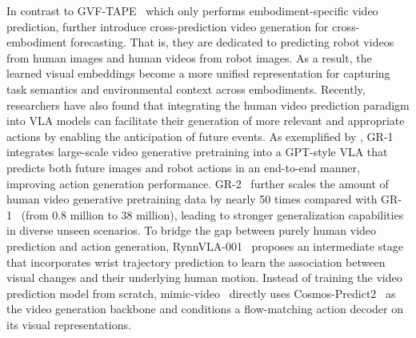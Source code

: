 \documentclass[Afour,sageh,times]{sagej}
\begin{document}
In contrast to GVF-TAPE~\citep{zhang2025generative} which only performs embodiment-specific video prediction, \cite{zhu2025learning} further introduce cross-prediction video generation for cross-embodiment forecasting. That is, they are dedicated to predicting robot videos from human images and human videos from robot images. As a result, the learned visual embeddings become a more unified representation for capturing task semantics and environmental context across embodiments. Recently, researchers have also found that integrating the human video prediction paradigm into VLA models can facilitate their generation of more relevant and appropriate actions by enabling the anticipation of future events. As exemplified by \cite{wu2023unleashing}, GR-1 integrates large-scale video generative pretraining into a GPT-style VLA that predicts both future images and robot actions in an end-to-end manner, improving action generation performance. GR-2~\citep{cheang2024gr} further scales the amount of human video generative pretraining data by nearly 50 times compared with GR-1~\citep{wu2023unleashing} (from 0.8 million to 38 million), leading to stronger generalization capabilities in diverse unseen scenarios. To bridge the gap between purely human video prediction and action generation, RynnVLA-001~\citep{jiang2025rynnvla} proposes an intermediate stage that incorporates wrist trajectory prediction to learn the association between visual changes and their underlying human motion. Instead of training the video prediction model from scratch, mimic-video~\citep{pai2025mimic} directly uses Cosmos-Predict2~\citep{agarwal2025cosmos,ali2025world} as the video generation backbone and conditions a flow-matching action decoder on its visual representations. 
\end{document}
